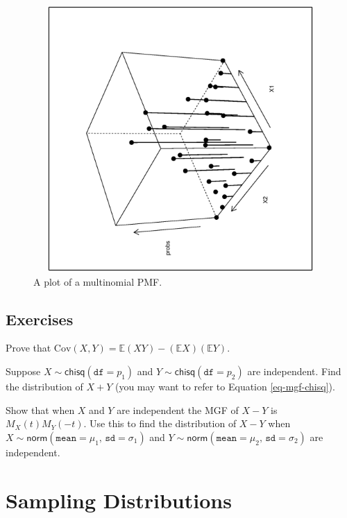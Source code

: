 \documentclass[captions=tableheading]{scrbook}
\begin{document}
\begin{figure}[th]
  \includegraphics[width=5in, height=4in]{ps/multdist/multinom-pmf2.ps}
  \caption[Plot of a multinomial PMF.]{\small A plot of a multinomial PMF.}
    \label{fig-multinom-pmf2}
\end{figure}


\newpage{}
\section{Exercises}
\label{sec-7-10}


\setcounter{thm}{0}

\begin{xca}
Prove that \( \mbox{Cov}(X,Y)=\mathbb{E}(XY)-(\mathbb{E} X)(\mathbb{E} Y). \)
\end{xca}

\begin{xca}
Suppose \(X\sim\mathsf{chisq}(\mathtt{df}=p_{1})\) and \(Y\sim\mathsf{chisq}(\mathtt{df}=p_{2})\) are independent. Find the distribution of \(X+Y\) (you may want to refer to Equation \ref{eq-mgf-chisq}).
\end{xca}

\begin{xca}
Show that when \(X\) and \(Y\) are independent the MGF of \(X-Y\) is \(M_{X}(t)M_{Y}(-t)\). Use this to find the distribution of \(X-Y\) when \(X\sim\mathsf{norm}(\mathtt{mean}=\mu_{1},\,\mathtt{sd}=\sigma_{1})\) and \(Y\sim\mathsf{norm}(\mathtt{mean}=\mu_{2},\,\mathtt{sd}=\sigma_{2})\)  are independent. 
\end{xca}
\chapter{Sampling Distributions}
\label{sec-8}
\label{cha-Sampling-Distributions}
\end{document}
